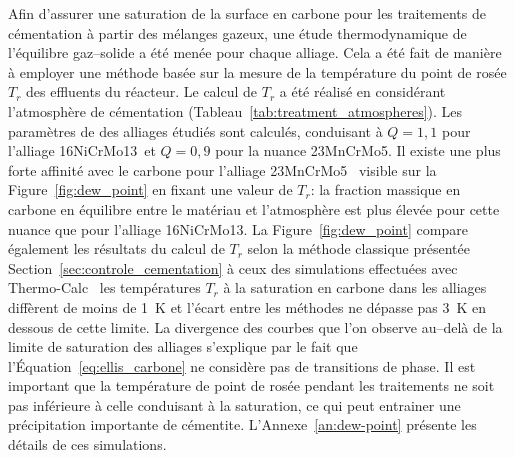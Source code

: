 Afin d'assurer une saturation de la surface en carbone pour les traitements de cémentation à partir des mélanges gazeux, une étude thermodynamique de l'équilibre gaz--solide a été menée pour chaque alliage. Cela a été fait de manière à employer une méthode basée sur la mesure de la température du point de rosée $T_{r}$ des effluents du réacteur. Le calcul de $T_{r}$ a été réalisé en considérant l'atmosphère de cémentation (Tableau~\ref{tab:treatment_atmospheres}). Les paramètres de \citet{Gunnarson1967} des alliages étudiés sont calculés, conduisant à $Q=1,1$ pour l'alliage 16NiCrMo13 et $Q=0,9$ pour la nuance 23MnCrMo5. Il existe une plus forte affinité avec le carbone pour l'alliage 23MnCrMo5 \textendash{} visible sur la Figure~\ref{fig:dew_point} en fixant une valeur de $T_{r}$: la fraction massique en carbone en équilibre entre le matériau et l'atmosphère est plus élevée pour cette nuance que pour l'alliage 16NiCrMo13. La Figure~\ref{fig:dew_point} compare également les résultats du calcul de $T_{r}$ selon la méthode classique présentée Section~\ref{sec:controle_cementation} à ceux des simulations effectuées avec Thermo-Calc~\cite{Andersson2002,Borgenstam2000} \textendash{} les températures $T_{r}$ à la saturation en carbone dans les alliages diffèrent de moins de \SI{1}{\kelvin} et l'écart entre les méthodes ne dépasse pas \SI{3}{\kelvin} en dessous de cette limite. La divergence des courbes que l'on observe au--delà de la limite de saturation des alliages s'explique par le fait que l'Équation~\ref{eq:ellis_carbone} ne considère pas de transitions de phase. Il est important que la température de point de rosée pendant les traitements ne soit pas inférieure à celle conduisant à la saturation, ce qui peut entrainer une précipitation importante de cémentite. L'Annexe~\ref{an:dew-point} présente les détails de ces simulations.

\begin{table}[h]
  \caption{\label{tab:treatment_atmospheres}Atmosphères pour les étapes de cémentation et de nitruration des traitements réalisés à la pression atmosphérique.}
  
  \centering{}\footnotesize{}%
\end{table}

